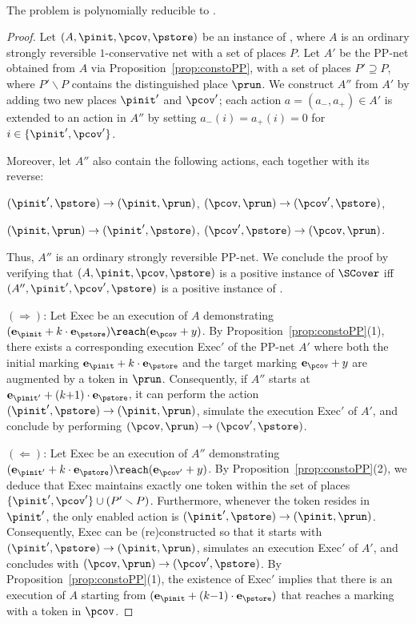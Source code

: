 \begin{prop}
\hfill\\
	The problem \SCover is polynomially reducible to \PPSCover.
\end{prop}
\begin{proof}
	Let $(A,\pinit, \pcov, \pstore)$ be an instance of \SCover,
where $A$ is an ordinary strongly reversible $1$-conservative net with
	a set of places $P$. 
Let $A'$ be the
	PP-net obtained from $A$ via Proposition~\ref{prop:constoPP},
with a set of places $P'\supseteq P$, where $P'\smallsetminus P$
	contains
	 the distinguished place $\prun$.
We construct $A''$ from $A'$ by adding two new places $\pinit'$ and
	$\pcov'$;
each action $a=(a_-,a_+)\in A'$ is extended to an
	action in $A''$ by setting $a_-(i)=a_+(i)=0$ for
	$i\in\{\pinit',\pcov'\}$.

Moreover, let $A''$ also contain
	the following 
	actions, each together with its reverse: 
	\begin{center}
	$(\pinit',\pstore)\rightarrow (\pinit,\prun)$, 
$(\pcov,\prun)\rightarrow(\pcov',\pstore)$,

	$(\pinit,\prun)\rightarrow(\pinit',\pstore)$,
	$(\pcov',\pstore)\rightarrow(\pcov,\prun)$. 
	\end{center}
Thus, $A''$ is an ordinary strongly reversible PP-net. We conclude the proof by verifying that 
	$(A,\pinit, \pcov, \pstore)$
	is a positive instance of $\SCover$ if{f}
	$(A'',\pinit', \pcov', \pstore)$ is a positive instance of \PPSCover.

	$(\Rightarrow)$:
Let Exec be an execution of $A$ demonstrating
$(\mathbf{e}_\pinit+k\cdot \mathbf{e}_\pstore)\reach
		(\mathbf{e}_\pcov+y)$.
By Proposition~\ref{prop:constoPP}(1), there exists a corresponding
execution  Exec$'$ of the PP-net $A'$ where both the initial marking
	$\mathbf{e}_{\pinit} + k \cdot
	\mathbf{e}_{\pstore}$ and the target marking
	$\mathbf{e}_{\pcov} + y$ are augmented by a token in
	$\prun$.
	Consequently, if $A''$ starts at $\mathbf{e}_{\pinit'}+(k{+}1)\cdot
	\mathbf{e}_\pstore$, it can perform the action
	$(\pinit',\pstore)\rightarrow (\pinit,\prun)$, simulate the
	execution Exec$'$ of $A'$, and conclude by performing
	$(\pcov,\prun)\rightarrow(\pcov',\pstore)$.



	$(\Leftarrow)$:
Let Exec be an execution of $A''$ demonstrating
	$(\mathbf{e}_{\pinit'}+k\cdot \mathbf{e}_\pstore)\reach
		(\mathbf{e}_{\pcov'}+y)$.
		By Proposition~\ref{prop:constoPP}(2), we deduce that Exec maintains
		exactly one token within the set of places
 $\{\pinit',\pcov'\}\cup (P'\smallsetminus P)$. Furthermore, whenever 
		the token resides in $\pinit'$, the only enabled action
		is $(\pinit',\pstore)\rightarrow (\pinit,\prun)$.
		Consequently, Exec can be (re)constructed so that it starts with
		$(\pinit',\pstore)\rightarrow (\pinit,\prun)$,
		simulates
		an execution Exec$'$ of $A'$, and concludes with
		$(\pcov,\prun)\rightarrow(\pcov',\pstore)$.
By Proposition~\ref{prop:constoPP}(1), the existence of Exec$'$ implies 
that there is an execution of $A$ starting from
$(\mathbf{e}_{\pinit}+(k{-}1)\cdot \mathbf{e}_\pstore)$ that reaches a
marking with a token in $\pcov$.
\end{proof}

